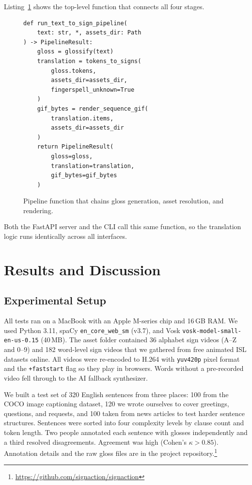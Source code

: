 \documentclass[conference]{IEEEtran}
\begin{document}
Listing~\ref{lst:pipeline} shows the top-level function that connects all four stages.

\begin{figure}[t]
\centering
\begin{minipage}{\columnwidth}
\begin{verbatim}
def run_text_to_sign_pipeline(
    text: str, *, assets_dir: Path
) -> PipelineResult:
    gloss = glossify(text)
    translation = tokens_to_signs(
        gloss.tokens,
        assets_dir=assets_dir,
        fingerspell_unknown=True
    )
    gif_bytes = render_sequence_gif(
        translation.items,
        assets_dir=assets_dir
    )
    return PipelineResult(
        gloss=gloss,
        translation=translation,
        gif_bytes=gif_bytes
    )
\end{verbatim}
\end{minipage}
\caption{Pipeline function that chains gloss generation, asset resolution, and rendering.}
\label{lst:pipeline}
\end{figure}

Both the FastAPI server and the CLI call this same function, so the translation logic runs identically across all interfaces.

\section{Results and Discussion}
\label{sec:results}

\subsection{Experimental Setup}

All tests ran on a MacBook with an Apple M-series chip and 16\,GB RAM. We used Python 3.11, spaCy \texttt{en\_core\_web\_sm} (v3.7), and Vosk \texttt{vosk-model-small-en-us-0.15} (40\,MB). The asset folder contained 36 alphabet sign videos (A--Z and 0--9) and 182 word-level sign videos that we gathered from free animated ISL datasets online. All videos were re-encoded to H.264 with \texttt{yuv420p} pixel format and the \texttt{+faststart} flag so they play in browsers. Words without a pre-recorded video fell through to the AI fallback synthesizer.

We built a test set of 320 English sentences from three places: 100 from the COCO image captioning dataset, 120 we wrote ourselves to cover greetings, questions, and requests, and 100 taken from news articles to test harder sentence structures. Sentences were sorted into four complexity levels by clause count and token length. Two people annotated each sentence with glosses independently and a third resolved disagreements. Agreement was high (Cohen's $\kappa > 0.85$). Annotation details and the raw gloss files are in the project repository.\footnote{\url{https://github.com/signaction/signaction}}
\end{document}
